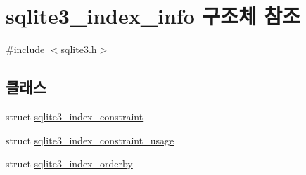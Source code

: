 \hypertarget{structsqlite3__index__info}{}\section{sqlite3\+\_\+index\+\_\+info 구조체 참조}
\label{structsqlite3__index__info}


{\ttfamily \#include $<$sqlite3.\+h$>$}

\subsection*{클래스}
\begin{DoxyCompactItemize}
\item 
struct \hyperlink{structsqlite3__index__info_1_1sqlite3__index__constraint}{sqlite3\+\_\+index\+\_\+constraint}
\item 
struct \hyperlink{structsqlite3__index__info_1_1sqlite3__index__constraint__usage}{sqlite3\+\_\+index\+\_\+constraint\+\_\+usage}
\item 
struct \hyperlink{structsqlite3__index__info_1_1sqlite3__index__orderby}{sqlite3\+\_\+index\+\_\+orderby}
\end{DoxyCompactItemize}
